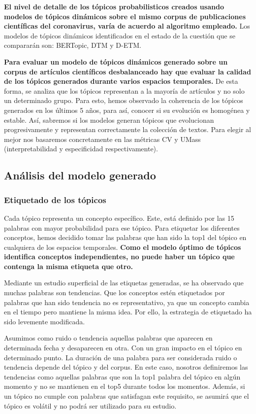 \documentclass[a4paper,10pt]{article}
\begin{document}
\textbf{El nivel de detalle de los tópicos probabilisticos creados usando modelos de tópicos dinámicos sobre el mismo corpus de publicaciones científicas del coronavirus, varía de acuerdo al algoritmo empleado.} Los modelos de tópicos dinámicos identificados en el estado de la cuestión que se compararán son: BERTopic, DTM y D-ETM.

\textbf{Para evaluar un modelo de tópicos dinámicos generado sobre un corpus de artículos científicos desbalanceado hay que evaluar la calidad de los tópicos generados durante varios espacios temporales.} De esta forma, se analiza que los tópicos representan a la mayoría de artículos y no solo un determinado grupo. Para esto, hemos observado la coherencia de los tópicos generados en los últimos 5 años, para así, conocer si su evolución es homogénea y estable. Así, sabremos si los modelos generan tópicos que evolucionan progresivamente y representan correctamente la colección de textos. Para elegir al mejor nos basaremos concretamente en las métricas CV y UMass (interpretabilidad y especificidad respectivamente).

\subsection{Análisis del modelo generado}

\subsubsection{Etiquetado de los tópicos}
Cada tópico representa un concepto específico. Este, está definido por las 15 palabras con mayor probabilidad para ese tópico. Para etiquetar los diferentes conceptos, hemos decidido tomar las palabras que han sido la top1 del tópico en cualquiera de los espacios temporales. \textbf{Como el modelo óptimo de tópicos identifica conceptos independientes, no puede haber un tópico que contenga la misma etiqueta que otro.}

Mediante un estudio superficial de las etiquetas generadas, se ha observado que muchas palabras son tendencias. Que los conceptos estén etiquetados por palabras que han sido tendencia no es representativo, ya que un concepto cambia en el tiempo pero mantiene la misma idea. Por ello, la estrategia de etiquetado ha sido levemente modificada.

Asumimos como ruido o tendencia aquellas palabras que aparecen en determinada fecha y desaparecen en otra. Con un gran impacto en el tópico en determinado punto. La duración de una palabra para ser considerada ruido o tendencia depende del tópico y del corpus. En este caso, nosotros definiremos las tendencias como aquellas palabras que son la top1 palabra del tópico en algún momento y no se mantienen en el top5 durante todos los momentos. Además, si un tópico no cumple con palabras que satisfagan este requisito, se asumirá que el tópico es volátil y no podrá ser utilizado para su estudio.
\end{document}
